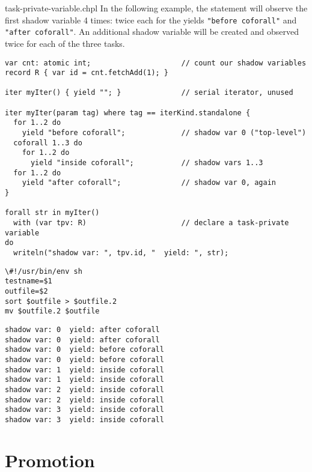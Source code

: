 \begin{chapelexample}{task-private-variable.chpl}
In the following example, the  statement will observe
the first shadow variable 4 times: twice each for the yields
{\tt "before coforall"} and {\tt "after coforall"}.
An additional shadow variable will be created and observed twice
for each of the three  tasks.
\begin{chapel}
\begin{verbatim}
var cnt: atomic int;                     // count our shadow variables
record R { var id = cnt.fetchAdd(1); }

iter myIter() { yield ""; }              // serial iterator, unused

iter myIter(param tag) where tag == iterKind.standalone {
  for 1..2 do
    yield "before coforall";             // shadow var 0 ("top-level")
  coforall 1..3 do
    for 1..2 do
      yield "inside coforall";           // shadow vars 1..3
  for 1..2 do
    yield "after coforall";              // shadow var 0, again
}

forall str in myIter()
  with (var tpv: R)                      // declare a task-private variable
do
  writeln("shadow var: ", tpv.id, "  yield: ", str);
\end{verbatim}
\end{chapel}
\begin{chapelprediff}
\begin{verbatim}
\#!/usr/bin/env sh
testname=$1
outfile=$2
sort $outfile > $outfile.2
mv $outfile.2 $outfile
\end{verbatim}
\end{chapelprediff}
\begin{chapeloutput}
\begin{verbatim}
shadow var: 0  yield: after coforall
shadow var: 0  yield: after coforall
shadow var: 0  yield: before coforall
shadow var: 0  yield: before coforall
shadow var: 1  yield: inside coforall
shadow var: 1  yield: inside coforall
shadow var: 2  yield: inside coforall
shadow var: 2  yield: inside coforall
shadow var: 3  yield: inside coforall
shadow var: 3  yield: inside coforall
\end{verbatim}
\end{chapeloutput}
\end{chapelexample}


\section{Promotion}
\label{Promotion}

